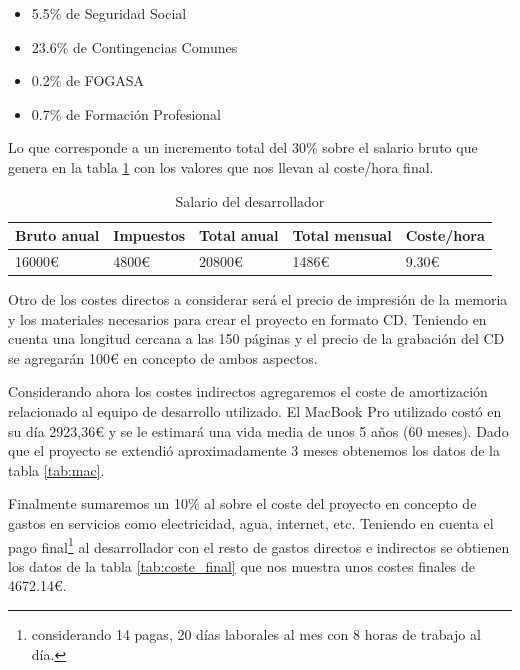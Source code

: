 \begin{itemize}
	\item 5.5\% de Seguridad Social
	\item 23.6\% de Contingencias Comunes
	\item 0.2\% de FOGASA
	\item 0.7\% de Formación Profesional
\end{itemize}

Lo que corresponde a un incremento total del 30\% sobre el salario bruto que genera en la tabla \ref{tab:salario} con los valores que nos llevan al coste/hora final.

\begin{table}
		\begin{tabular}{|l|l|l|l|l|}
			\hline
			\textbf{Bruto anual} & \textbf{Impuestos} & \textbf{Total anual} & \textbf{Total mensual} & \textbf{Coste/hora} \\
			
			\hline
			16000\euro{}& 4800\euro{} & 20800\euro{} & 1486\euro{} & 9.30\euro{} \\
			
			\hline
		\end{tabular}
		\caption{Salario del desarrollador}
		\label{tab:salario}
\end{table}

\bigskip

Otro de los costes directos a considerar será el precio de impresión de la memoria y los materiales necesarios para crear el proyecto en formato CD. Teniendo en cuenta una longitud cercana a las 150 páginas y el precio de la grabación del CD se agregarán 100\euro{} en concepto de ambos aspectos.

\bigskip

Considerando ahora los costes indirectos agregaremos el coste de amortización relacionado al equipo de desarrollo utilizado. El MacBook Pro utilizado costó en su día 2923,36\euro{} y se le estimará una vida media de unos 5 años (60 meses). Dado que el proyecto se extendió aproximadamente 3 meses obtenemos los datos de la tabla \ref{tab:mac}.

Finalmente sumaremos un 10\% al sobre el coste del proyecto en concepto de gastos en servicios como electricidad, agua, internet, etc. Teniendo en cuenta el pago final\footnote{considerando 14 pagas, 20 días laborales al mes con 8 horas de trabajo al día.} al desarrollador con el resto de gastos directos e indirectos se obtienen los datos de la tabla \ref{tab:coste_final} que nos muestra unos costes finales de 4672.14\euro{}.

